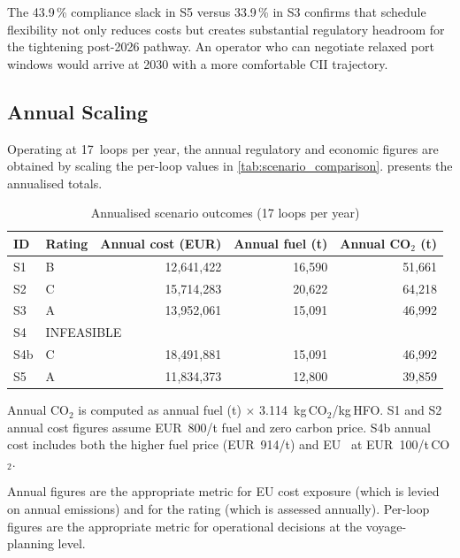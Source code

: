 The 43.9\,\% compliance slack in S5 versus 33.9\,\% in S3 confirms that
schedule flexibility not only reduces costs but creates substantial
regulatory headroom for the tightening post-2026 pathway.  An operator
who can negotiate relaxed port windows would arrive at 2030 with a more
comfortable CII trajectory.

\subsection{Annual Scaling}
\label{sec:res:annual}

Operating at 17~loops per year, the annual regulatory and economic figures
are obtained by scaling the per-loop values in \cref{tab:scenario_comparison}.
 presents the annualised totals.

\begin{table}[h]
\centering
\caption{Annualised scenario outcomes (17 loops per year)}
\label{tab:annual_summary}
\begin{tabular}{llrrr}
  \toprule
  ID & Rating & {Annual cost (EUR)} & {Annual fuel (t)} & {Annual CO$_2$ (t)} \\
  \midrule
  S1  & B & 12{,}641{,}422 & 16{,}590 & 51{,}661 \\
  S2  & C & 15{,}714{,}283 & 20{,}622 & 64{,}218 \\
  S3  & A & 13{,}952{,}061 & 15{,}091 & 46{,}992 \\
  S4  & \multicolumn{4}{l}{INFEASIBLE} \\
  S4b & C & 18{,}491{,}881 & 15{,}091 & 46{,}992 \\
  S5  & A & 11{,}834{,}373 & 12{,}800 & 39{,}859 \\
  \bottomrule
\end{tabular}
\end{table}

Annual CO$_2$ is computed as annual fuel (t) $\times$ 3.114~kg\,CO$_2$/kg\,HFO.
S1 and S2 annual cost figures assume EUR~800/t fuel and zero carbon price.
S4b annual cost includes both the higher fuel price (EUR~914/t) and
EU~\ETS{} at EUR~100/t\,CO$_2$.

Annual figures are the appropriate metric for EU \ETS{} cost exposure
(which is levied on annual emissions) and for the \CII{} rating (which
is assessed annually).  Per-loop figures are the appropriate metric for
operational decisions at the voyage-planning level.
